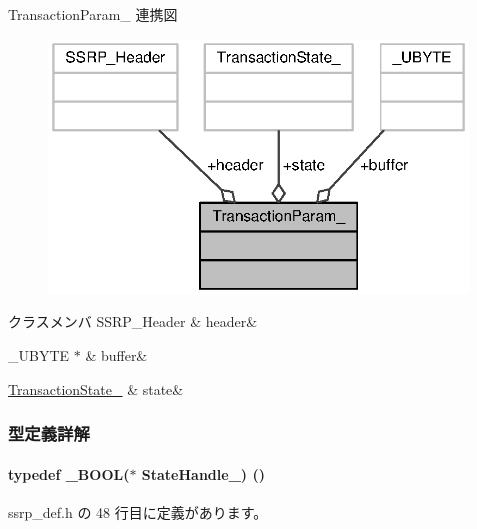 Transaction\+Param\+\_\+ 連携図\nopagebreak
\begin{figure}[H]
\begin{center}
\leavevmode
\includegraphics[width=316pt]{d1/d0e/structTransactionParam____coll__graph}
\end{center}
\end{figure}
\begin{DoxyFields}{クラスメンバ}
S\+S\+R\+P\+\_\+\+Header\label{ssrp__def_8h_a40c9420b893eef458836db614475be17}
&
header&
\\
\hline

\+\_\+\+U\+B\+Y\+T\+E $\ast$\label{ssrp__def_8h_a05183929478e5ba2d4377b7b2cf1561f}
&
buffer&
\\
\hline

\hyperlink{ssrp__def_8h_ab2e37133ccae2faa3b78d487d6a436f8_ab2e37133ccae2faa3b78d487d6a436f8}{Transaction\+State\+\_\+}\label{ssrp__def_8h_a597e4d4ef35a1572f488f461d35b3cdc}
&
state&
\\
\hline

\end{DoxyFields}


\subsubsection{型定義詳解}
\paragraph[{State\+Handle\+\_\+}]{\setlength{\rightskip}{0pt plus 5cm}typedef \+\_\+\+B\+O\+O\+L($\ast$ State\+Handle\+\_\+) ()}\label{ssrp__def_8h_ac695a0ebfafafd2768e9c88bfd43f100_ac695a0ebfafafd2768e9c88bfd43f100}


 ssrp\+\_\+def.\+h の 48 行目に定義があります。



